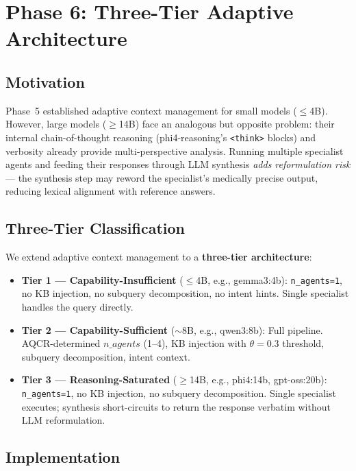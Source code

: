 \documentclass[conference]{IEEEtran}
\begin{document}
\section{Phase 6: Three-Tier Adaptive Architecture}
\label{sec:phase6}

\subsection{Motivation}

Phase~5 established adaptive context management for small models ($\leq$4B). However, large models ($\geq$14B) face an analogous but opposite problem: their internal chain-of-thought reasoning (phi4-reasoning's \texttt{<think>} blocks) and verbosity already provide multi-perspective analysis. Running multiple specialist agents and feeding their responses through LLM synthesis \textit{adds reformulation risk} — the synthesis step may reword the specialist's medically precise output, reducing lexical alignment with reference answers.

\subsection{Three-Tier Classification}

We extend adaptive context management to a \textbf{three-tier architecture}:

\begin{itemize}[noitemsep,topsep=2pt]
    \item \textbf{Tier 1 — Capability-Insufficient} ($\leq$4B, e.g., gemma3:4b): \texttt{n\_agents=1}, no KB injection, no subquery decomposition, no intent hints. Single specialist handles the query directly.
    \item \textbf{Tier 2 — Capability-Sufficient} ($\sim$8B, e.g., qwen3:8b): Full pipeline. AQCR-determined $n\_agents$ (1--4), KB injection with $\theta=0.3$ threshold, subquery decomposition, intent context.
    \item \textbf{Tier 3 — Reasoning-Saturated} ($\geq$14B, e.g., phi4:14b, gpt-oss:20b): \texttt{n\_agents=1}, no KB injection, no subquery decomposition. Single specialist executes; synthesis short-circuits to return the response verbatim without LLM reformulation.
\end{itemize}

\subsection{Implementation}
\end{document}
